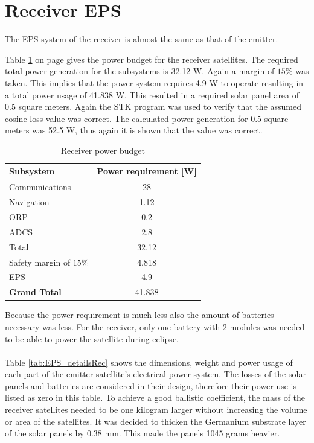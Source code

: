 \section{Receiver EPS}
\label{receiver_EPS}

The EPS system of the receiver is almost the same as that of the emitter.

Table \ref{tab:receiverPowerBudget} on page \pageref{tab:receiverPowerBudget} gives the power budget for the receiver satellites. The required total power generation for the subsystems is 32.12 W. Again a margin of $15\%$ was taken. This implies that the power system requires 4.9 W to operate resulting in a total power usage of 41.838 W. This resulted in a required solar panel area of 0.5 square meters. Again the STK program was used to verify that the assumed cosine loss value was correct. The calculated power generation for 0.5 square meters was 52.5 W, thus again it is shown that the value was correct.

\begin{table}
\centering
\begin{tabular}{lc}
\hline
Subsystem & Power requirement [W]\\
\midrule
Communications & 28\\
Navigation & 1.12\\
ORP & 0.2\\
ADCS & 2.8\\
\midrule
Total & 32.12\\
Safety margin of $15\%$ & 4.818\\
EPS & 4.9\\
\midrule
\midrule
\textbf{Grand Total} & 41.838\\
\hline
\end{tabular}
\caption{Receiver power budget}
\label{tab:receiverPowerBudget}
\end{table}

Because the power requirement is much less also the amount of batteries necessary was less. For the receiver, only one battery with 2 modules was needed to be able to power the satellite during eclipse.
\\\\
Table \ref{tab:EPS_detailsRec} shows the dimensions, weight and power usage of each part of the emitter satellite's electrical power system. The losses of the solar panels and batteries are considered in their design, therefore their power use is listed as zero in this table. To achieve a good ballistic coefficient, the mass of the receiver satellites needed to be one kilogram larger without increasing the volume or area of the satellites. It was decided to thicken the Germanium substrate layer of the solar panels by 0.38 mm. This made the panels 1045 grams heavier.

